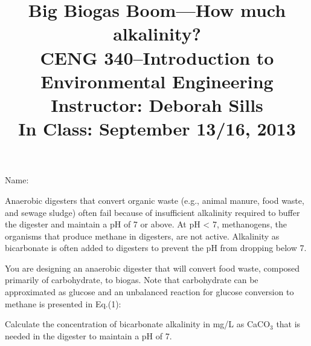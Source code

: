 \documentclass[11pt,letterpaper]{article}
\begin{document}
\setlength{\parindent}{0cm} 



\frenchspacing

\setlength{\textwidth}{6.25in}

\title {\Large{\textbf{Big Biogas Boom---How much alkalinity?}}\\ \large{CENG 340--Introduction to Environmental Engineering\\
Instructor: Deborah Sills\\ \textbf{In Class: September 13/16, 2013}}}

\author {}
\date {}
\maketitle

\vspace{-1.5cm}

\large{Name:}

\vspace{-0.3cm}

Anaerobic digesters that convert organic waste (e.g., animal manure, food waste, and sewage sludge) often fail because of insufficient alkalinity required to buffer the digester and maintain a pH of 7 or above.  At pH < 7, methanogens, the organisms that produce methane in digesters, are not active. Alkalinity as bicarbonate is often added to digesters to prevent the pH from dropping below 7. 

You are designing an anaerobic digester that will convert food waste, composed primarily of carbohydrate, to biogas.  Note that carbohydrate can be approximated as glucose and an unbalanced reaction for glucose conversion to methane is presented in Eq.(1):


Calculate the concentration of bicarbonate alkalinity in mg/L as CaCO$_3$ that is needed in the digester to maintain a pH of 7.   
\end{document}
